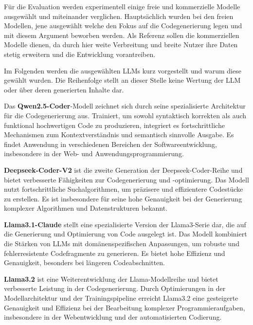 Für die Evaluation werden experimentell einige freie und kommerzielle Modelle ausgewählt und miteinander verglichen. Hauptsächlich wurden bei den freien Modellen, jene ausgewählt welche den Fokus auf die Codegenerierung legen und mit diesem Argument beworben werden. Als Referenz sollen die kommerziellen Modelle dienen, da durch hier weite Verbreitung und breite Nutzer ihre Daten stetig erweitern und die Entwicklung vorantreiben.\vspace{0.2cm}

Im Folgenden werden die ausgewählten LLMs kurz vorgestellt und warum diese gewählt wurden. Die Reihenfolge stellt an dieser Stelle keine Wertung der LLM oder über deren generierten Inhalte dar.\vspace{0.2cm}

Das \textbf{Qwen2.5-Coder}-Modell zeichnet sich durch seine spezialisierte Architektur für die Codegenerierung aus. Trainiert, um sowohl syntaktisch korrekten als auch funktional hochwertigen Code zu produzieren, integriert es fortschrittliche Mechanismen zum Kontextverständnis und semantisch sinnvolle Ausgabe. Es findet Anwendung in verschiedenen Bereichen der Softwareentwicklung, insbesondere in der Web- und Anwendungsprogrammierung.\vspace{0.2cm}

\textbf{Deepseek-Coder-V2} ist die zweite Generation der Deepseek-Coder-Reihe und bietet verbesserte Fähigkeiten zur Codegenerierung und -optimierung. Das Modell nutzt fortschrittliche Suchalgorithmen, um präzisere und effizientere Codestücke zu erstellen. Es ist insbesondere für seine hohe Genauigkeit bei der Generierung komplexer Algorithmen und Datenstrukturen bekannt.\vspace{0.2cm}

\textbf{Llama3.1-Claude} stellt eine spezialisierte Version der Llama3-Serie dar, die auf die Generierung und Optimierung von Code ausgelegt ist. Das Modell kombiniert die Stärken von LLMs mit domänenspezifischen Anpassungen, um robuste und fehlerresistente Codefragmente zu generieren. Es bietet hohe Effizienz und Genauigkeit, besonders bei längeren Codeabschnitten.\vspace{0.2cm}

\textbf{Llama3.2} ist eine Weiterentwicklung der Llama-Modellreihe und bietet verbesserte Leistung in der Codegenerierung. Durch Optimierungen in der Modellarchitektur und der Trainingspipeline erreicht Llama3.2 eine gesteigerte Genauigkeit und Effizienz bei der Bearbeitung komplexer Programmieraufgaben, insbesondere in der Webentwicklung und der automatisierten Codierung.\vspace{0.2cm}

